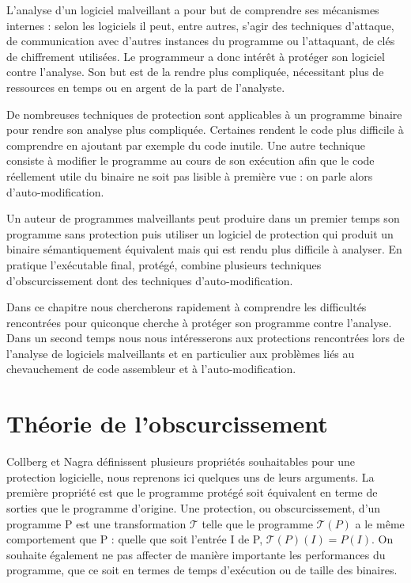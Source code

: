 L'analyse d'un logiciel malveillant a pour but de comprendre ses mécanismes internes : selon les logiciels il peut, entre autres, s'agir des techniques d'attaque, de communication avec d'autres instances du programme ou l'attaquant, de clés de chiffrement utilisées. Le programmeur a donc intérêt à protéger son logiciel contre l'analyse. Son but est de la rendre plus compliquée, nécessitant plus de ressources en temps ou en argent de la part de l'analyste.

De nombreuses techniques de protection sont applicables à un programme binaire pour rendre son analyse plus compliquée. Certaines rendent le code plus difficile à comprendre en ajoutant par exemple du code inutile. Une autre technique consiste à modifier le programme au cours de son exécution afin que le code réellement utile du binaire ne soit pas lisible à première vue : on parle alors d'auto-modification.

Un auteur de programmes malveillants peut produire dans un premier temps son programme sans protection puis utiliser un logiciel de protection qui produit un binaire sémantiquement équivalent mais qui est rendu plus difficile à analyser. En pratique l'exécutable final, protégé, combine plusieurs techniques d'obscurcissement dont des techniques d'auto-modification.

Dans ce chapitre nous chercherons rapidement à comprendre les difficultés rencontrées pour quiconque cherche à protéger son programme contre l'analyse. Dans un second temps nous nous intéresserons aux protections rencontrées lors de l'analyse de logiciels malveillants et en particulier aux problèmes liés au chevauchement de code assembleur et à l'auto-modification.



\section{Théorie de l'obscurcissement}
Collberg et Nagra \cite{nagra2009surreptitious} définissent plusieurs propriétés souhaitables pour une protection logicielle, nous reprenons ici quelques uns de leurs arguments. La première propriété est que le programme protégé soit équivalent en terme de sorties que le programme d'origine.
Une protection, ou obscurcissement, d'un programme P est une transformation $\mathcal{T}$ telle que le programme $\mathcal{T}(P)$ a le même comportement que P : quelle que soit l'entrée I de P, $\mathcal{T}(P)(I)=P(I)$.
On souhaite également ne pas affecter de manière importante les performances du programme, que ce soit en termes de temps d'exécution ou de taille des binaires.

